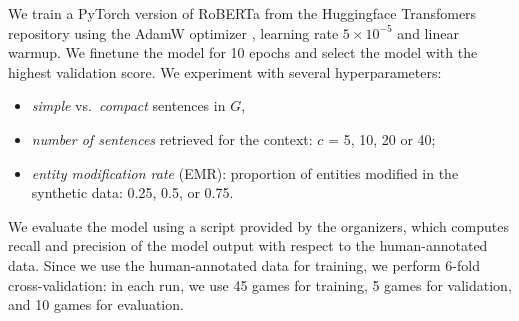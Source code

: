We train a PyTorch version of RoBERTa from the Huggingface Transfomers repository \cite{wolf2019HuggingFacesTS} using the AdamW optimizer \cite{loshchilov2018fixing}, learning rate $5\times10^{-5}$ and linear warmup.
We finetune the model for 10 epochs and select the model with the highest validation score.
We experiment with several hyperparameters: %
\begin{itemize}
    \item \emph{simple} vs.~\emph{compact} sentences in $G$, %
    \item  \textit{number of sentences} retrieved for the context: $c$ = 5, 10, 20 or 40;
    \item \textit{entity modification rate} (EMR): proportion of entities modified in the synthetic data: 0.25, 0.5, or 0.75.
\end{itemize}
We evaluate the model using a script provided by the organizers, which computes recall and precision of the model output with respect to the human-annotated data. Since we use the human-annotated data for training, we perform 6-fold cross-validation: in each run, we use 45 games for training, 5 games for validation, and 10 games for evaluation.


